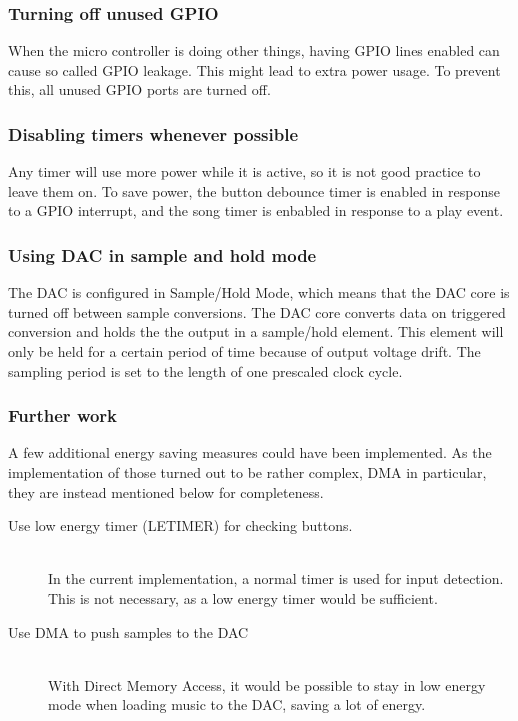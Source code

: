 \subsubsection{Turning off unused GPIO}
When the micro controller is doing other things, having GPIO lines enabled can cause so called GPIO leakage.
This might lead to extra power usage.
To prevent this, all unused GPIO ports are turned off.

\subsubsection{Disabling timers whenever possible}
Any timer will use more power while it is active, so it is not good practice to leave them on.
To save power, the button debounce timer is enabled in response to a GPIO interrupt, and the song timer is enbabled in response to a play event. 

\subsubsection{Using DAC in sample and hold mode}
The DAC is configured in Sample/Hold Mode, which means that the DAC core is turned off between sample conversions.
The DAC core converts data on triggered conversion and holds the the output in a sample/hold element.
This element will only be held for a certain period of time because of output voltage drift.
The sampling period is set to the length of one prescaled clock cycle.

\subsubsection{Further work}
A few additional energy saving measures could have been implemented.
As the implementation of those turned out to be rather complex, DMA in particular, they are instead mentioned below for completeness.

\begin{description}
  \item[Use low energy timer (LETIMER) for checking buttons.] \hfill \\
        In the current implementation, a normal timer is used for input detection. This is not necessary, as a low energy timer would be sufficient. 
  \item[Use DMA to push samples to the DAC] \hfill \\
        With Direct Memory Access, it would be possible to stay in low energy mode when loading music to the DAC, saving a lot of energy.
\end{description}



